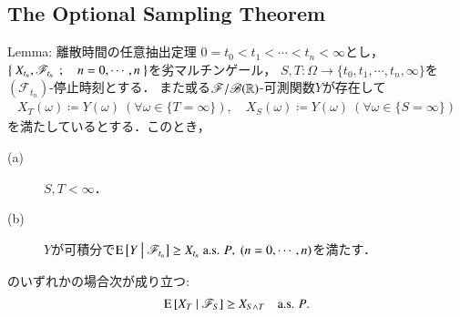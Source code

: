 \subsection{The Optional Sampling Theorem}
	\begin{itembox}[l]{Lemma: 離散時間の任意抽出定理}
		$0 = t_0 < t_1 < \cdots < t_n < \infty$とし，
		$\left\{\ X_{t_n},\mathscr{F}_{t_n}\ \, ; \quad n=0,\cdots,n\ \right\}$を劣マルチンゲール，
		$S,T:\Omega \longrightarrow \{t_0,t_1,\cdots,t_n,\infty\}$を$(\mathscr{F}_{t_n})$-停止時刻とする．
		また或る$\mathscr{F}/\mathscr{B}(\mathbb{R})$-可測関数$Y$が存在して
		\begin{align}
			X_T(\omega) \coloneqq Y(\omega)\ (\forall \omega \in \{T=\infty\}),
			\quad X_S(\omega) \coloneqq Y(\omega)\ (\forall \omega \in \{S=\infty\})
		\end{align}
		を満たしているとする．このとき，
		\begin{description}
			\item[(a)] $S,T < \infty$．
			\item[(b)] $Y$が可積分で$\cexp{Y}{\mathscr{F}_{t_n}} \geq X_{t_n}\ \mbox{a.s. $P$},\ (n=0,\cdots,n)$を満たす．
		\end{description}
		のいずれかの場合次が成り立つ:
		\begin{align}
			\operatorname{E} \left[ X_T \ \middle|\ \mathscr{F}_S \right] \geq X_{S \wedge T}
			\quad \mbox{a.s. $P$}.
			\label{eq:lem_optional_sampling_theorem_1}
		\end{align}
	\end{itembox}
	

